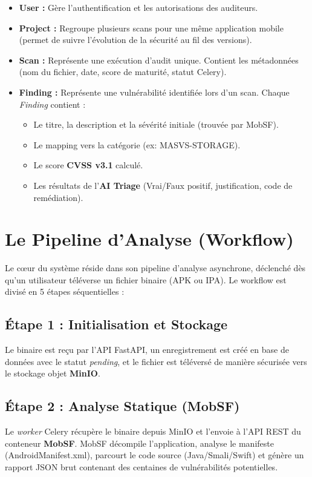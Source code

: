 \begin{tcolorbox}[codebox, title={Entités Principales du Modèle de Données}]
\begin{itemize}[label=\textcolor{PrimaryBlue}{\faDatabase}]
    \item \textbf{User :} Gère l'authentification et les autorisations des auditeurs.
    \item \textbf{Project :} Regroupe plusieurs scans pour une même application mobile (permet de suivre l'évolution de la sécurité au fil des versions).
    \item \textbf{Scan :} Représente une exécution d'audit unique. Contient les métadonnées (nom du fichier, date, score de maturité, statut Celery).
    \item \textbf{Finding :} Représente une vulnérabilité identifiée lors d'un scan. Chaque \textit{Finding} contient :
    \begin{itemize}
        \item Le titre, la description et la sévérité initiale (trouvée par MobSF).
        \item Le mapping vers la catégorie  (ex: MASVS-STORAGE).
        \item Le score \textbf{CVSS v3.1} calculé.
        \item Les résultats de l'\textbf{AI Triage} (Vrai/Faux positif, justification, code de remédiation).
    \end{itemize}
\end{itemize}
\end{tcolorbox}

\section{Le Pipeline d'Analyse (Workflow)}
Le cœur du système réside dans son pipeline d'analyse asynchrone, déclenché dès qu'un utilisateur téléverse un fichier binaire (APK ou IPA). Le workflow est divisé en 5 étapes séquentielles :

\subsection{Étape 1 : Initialisation et Stockage}
Le binaire est reçu par l'API FastAPI, un enregistrement  est créé en base de données avec le statut \textit{pending}, et le fichier est téléversé de manière sécurisée vers le stockage objet \textbf{MinIO}.

\subsection{Étape 2 : Analyse Statique (MobSF)}
Le \textit{worker} Celery récupère le binaire depuis MinIO et l'envoie à l'API REST du conteneur \textbf{MobSF}. MobSF décompile l'application, analyse le manifeste (AndroidManifest.xml), parcourt le code source (Java/Smali/Swift) et génère un rapport JSON brut contenant des centaines de vulnérabilités potentielles.

